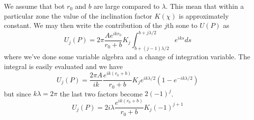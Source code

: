 \documentclass[../../main.tex]{subfiles} %
\begin{document}
We assume that bot $r_0$ and $b$ are large compared to $\lambda$. This mean that within a particular zone the value of the inclination factor $K(\chi)$ is approximately constant. We may then write the contribution of the $j$th sone to $U(P)$ as
\begin{equation}
    U_j(P)=2\pi\frac{Ae^{ikr_0}}{r_0+b}K_j\int_{b+(j-1)\lambda/2}^{b+j\lambda/2}e^{iks}ds
\end{equation}
where we've done some variable algebra and a change of integration variable. The integral is easily evaluated and we have
\begin{equation}
    U_j(P)=\frac{2\pi A}{ik}\frac{e^{ik(r_0+b)}}{r_0+b}K_j e^{ik\lambda/2} \left(1-e^{-ik\lambda/2}\right)
\end{equation}
but since $k\lambda=2\pi$ the last two factors become $2(-1)^j$. 
\begin{equation}\label{eq. Fresnel zone contribution}
    U_j(P)=2i\lambda\frac{e^{ik(r_0+b)}}{r_0+b}K_j (-1)^{j+1}
\end{equation}
\end{document}

